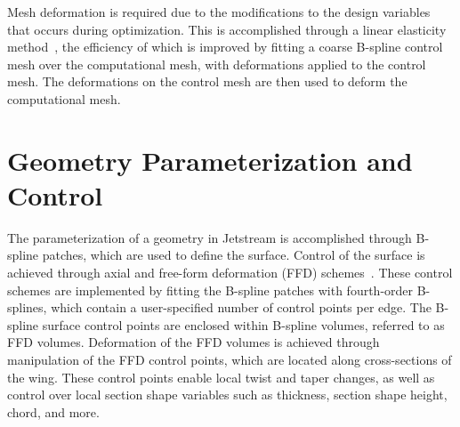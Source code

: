 Mesh deformation is required due to the modifications to the design variables that occurs during optimization. This is accomplished through a linear elasticity method~\cite{hicken_aerodynamic_2010,truong_mesh_2008}, the efficiency of which is improved by fitting a coarse B-spline control mesh over the computational mesh, with deformations applied to the control mesh. The deformations on the control mesh are then used to deform the computational mesh.
~\section{Geometry Parameterization and Control}
The parameterization of a geometry in Jetstream is accomplished through B-spline patches, which are used to define the surface. Control of the surface is achieved through axial and free-form deformation (FFD) schemes~\cite{gagnon_two-level_2015}. These control schemes are implemented by fitting the B-spline patches with fourth-order B-splines, which contain a user-specified number of control points per edge. The B-spline surface control points are enclosed within B-spline volumes, referred to as FFD volumes. Deformation of the FFD volumes is achieved through manipulation of the FFD control points, which are located along cross-sections of the wing. These control points enable local twist and taper changes, as well as control over local section shape variables such as thickness, section shape height, chord, and more.

